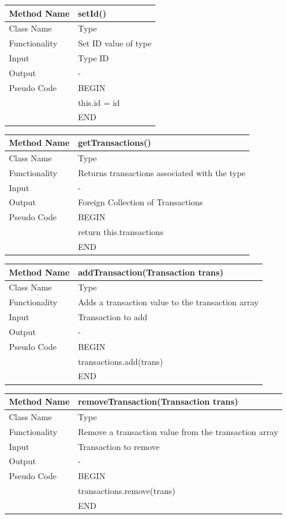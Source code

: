 \documentclass[12pt]{article}
\begin{document}
\begin{tabular}{ |p{3cm}||p{\colWidth}|  }
	\hline
	Method Name & setId()\\
	\hline
	Class Name & Type\\
	\hline
	Functionality & Set ID value of type\\
	\hline
	Input & Type ID\\
	\hline
	Output & -\\
	\hline
	Pseudo Code&BEGIN\\ & this.id = id\\&END\\
	\hline
\end{tabular}      

\begin{tabular}{ |p{3cm}||p{\colWidth}|  }
	\hline
	Method Name & getTransactions()\\
	\hline
	Class Name & Type\\
	\hline
	Functionality & Returns transactions associated with the type\\
	\hline
	Input & -  \\
	\hline
	Output & Foreign Collection of Transactions\\
	\hline
	Pseudo Code&BEGIN\\ & return this.transactions\\&END\\
	\hline
\end{tabular}        

\begin{tabular}{ |p{3cm}||p{\colWidth}|  }
	\hline
	Method Name & addTransaction(Transaction trans)\\
	\hline
	Class Name & Type\\
	\hline
	Functionality & Adds a transaction value to the transaction array\\
	\hline
	Input & Transaction to add\\
	\hline
	Output & - \\
	\hline
	Pseudo Code&BEGIN\\ & transactions.add(trans)\\&END\\
	\hline
\end{tabular}        

\begin{tabular}{ |p{3cm}||p{\colWidth}|  }
	\hline
	Method Name & removeTransaction(Transaction trans)\\
	\hline
	Class Name & Type\\
	\hline
	Functionality & Remove a transaction value from the transaction array\\
	\hline
	Input & Transaction to remove\\
	\hline
	Output & - \\
	\hline
	Pseudo Code&BEGIN\\ & transactions.remove(trans)\\&END\\
	\hline
\end{tabular}        
\end{document}
